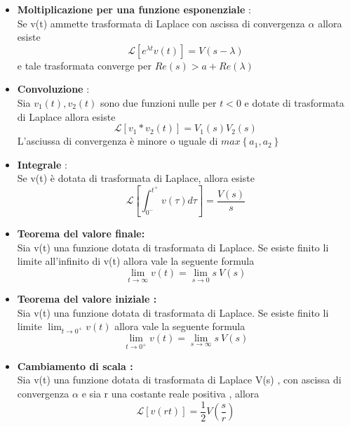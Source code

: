 \documentclass{article}
\theoremstyle{definition}
\newcommand{\la}{\lambda}
\begin{document}
\begin{itemize}
	\item \textbf{Moltiplicazione per una funzione esponenziale} : \\
	Se v(t) ammette trasformata di Laplace con ascissa di convergenza $\alpha$ allora esiste 
	$$\mathcal{L}[e^{\la t}v(t)]=V(s-\la)$$ e tale trasformata converge per $Re(s)>a +Re(\la) $
	\item \textbf{Convoluzione} : 	\\
	Sia $v_1(t),v_2(t)$ sono due funzioni nulle per $t<0$ e dotate di trasformata di Laplace  allora esiste 
	$$\mathcal{L}[v_1*v_2(t)]=V_1(s)V_2(s)$$
	L'asciussa di convergenza è minore o uguale di $max\left\{a_1,a_2\right\}$
	\item \textbf{Integrale} : \\
	Se v(t)  è dotata di trasformata di Laplace, allora esiste 
	$$\mathcal{L}\left[\int_{0^-}^{t^+}v(\tau)d\tau\right]=\frac{V(s)}{s}$$
	
	\item \textbf{Teorema del valore finale:}\\ 
	Sia v(t) una funzione dotata di trasformata di Laplace. Se esiste finito li limite all'infinito di v(t) allora vale la seguente formula 
	$$\lim_{t \rightarrow \infty } v(t)=\lim_{s \rightarrow 0} s \ V(s)$$
	\item \textbf{Teorema del valore iniziale :}\\
	Sia v(t) una funzione dotata di trasformata di Laplace. Se esiste finito li limite $\lim_{t\rightarrow 0^+}v(t)$ allora vale la seguente formula 
	$$\lim_{t \rightarrow 0^+} v(t)=\lim_{s \rightarrow \infty} s \ V(s)$$
	\item \textbf{Cambiamento di scala :} \\ 
		Sia v(t) una funzione dotata di trasformata di Laplace V(s) , con ascissa di convergenza $\alpha$ e sia r una costante reale positiva , allora 
	$$\mathcal{L}\left[v(rt)\right]=\frac{1}{2}V(\frac{s}{r})$$
	\end{itemize}
	
\end{document}
